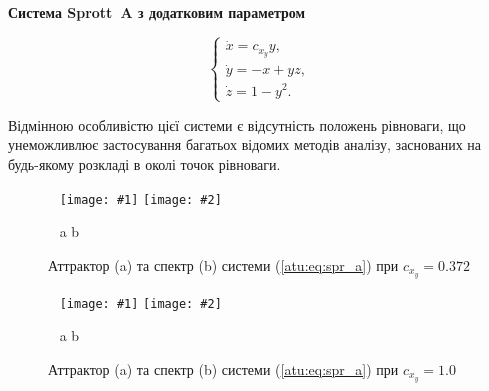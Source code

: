 \documentclass[14pt,handout,utf8]{beamer}
\newcommand{\Xhead}[1]{
 \begin{center}%
      \textbf{#1}%
 \end{center}%
}
\newcommand{\ABlbl}{%
  \vspace{-2.7ex}
  \begin{center}
    ~ \hfill a \hfill\hfill b \hfill ~
  \end{center}
  \vspace{-2.0ex}
}
\newcommand{\PicDouble}[2]{%
 \begin{center}
    ~ \hfill
    \texttt{[image: \#1]}
    \hfill
    \texttt{[image: \#2]}
    \hfill ~
  \end{center}
  \ABlbl
}
\begin{document}

\begin{frame}
  \frametitle{~}

  \Xhead{Система Sprott~A з додатковим параметром}

  \begin{equation}
    \begin{cases}
      \dot{x} =  c_{x_y} y, \\
      \dot{y} = -x + yz, \\
      \dot{z} =  1 - y^2.
    \end{cases}
    \label{atu:eq:spr_a}
  \end{equation}

Відмінною особливістю цієї системи є відсутність положень рівноваги, що унеможливлює
застосування багатьох відомих методів аналізу, заснованих на будь-якому
розкладі в околі точок рівноваги.

  \begin{figure}
    \PicDouble{../p5/p/cha/spr_a/sprott_a-p_xyz_cx_y=0x372.png}{../p5/p/cha/spr_a/sprott_a_f-p_f_cx_y=0x372.png}
    \caption{Аттрактор (a) та спектр (b) системи (\ref{atu:eq:spr_a}) при $c_{x_y} =0.372$}
    \label{atu:f:spr_a_p_0372}
  \end{figure}

  \begin{figure}[htb!]
    \PicDouble{../p5/p/cha/spr_a/sprott_a-p_xyz_cx_y=1x000.png}{../p5/p/cha/spr_a/sprott_a_f-p_f_cx_y=1x000.png}
    \caption{Аттрактор (a) та спектр (b) системи (\ref{atu:eq:spr_a}) при $c_{x_y} =1.0$}
    \label{atu:f:spr_a_p_1000}
  \end{figure}

\end{frame}

\end{document}
